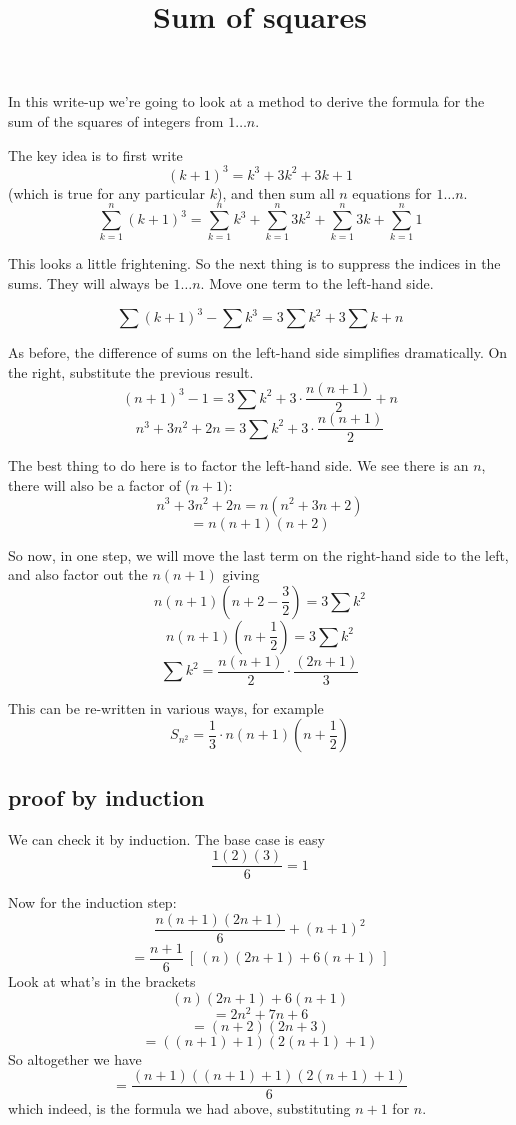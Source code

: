 \documentclass[11pt, oneside]{article}
\title{Sum of squares}
\date{}
\begin{document}
\maketitle
\Large


In this write-up we're going to look at a method to derive the formula for the sum of the squares of integers from $1 \dots n$.

The key idea is to first write
\[ (k + 1)^3 = k^3 + 3k^2 + 3k + 1 \]
(which is true for any particular $k$), and then sum all $n$ equations for $1 \dots n$.
\[ \sum_{k=1}^n (k+1)^3 = \sum_{k=1}^n k^3 + \sum_{k=1}^n 3k^2 + \sum_{k=1}^n 3k + \sum_{k=1}^n 1 \]

This looks a little frightening.  So the next thing is to suppress the indices in the sums.  They will always be $1 \dots n$.  Move one term to the left-hand side.

\[ \sum (k+1)^3 - \sum k^3 = 3 \sum k^2 + 3 \sum k + n \]

As before, the difference of sums on the left-hand side simplifies dramatically.  On the right, substitute the previous result.
\[ (n+1)^3 - 1 = 3 \sum k^2 + 3 \cdot \frac{n(n+1)}{2} + n \]
\[ n^3 + 3n^2 + 2n = 3 \sum k^2 + 3 \cdot \frac{n(n+1)}{2}  \]

The best thing to do here is to factor the left-hand side.  We see there is an $n$, there will also be a factor of ($n + 1)$:
\[ n^3 + 3n^2 + 2n = n(n^2 + 3n + 2) \]
\[ = n (n + 1)(n + 2) \]

So now, in one step, we will move the last term on the right-hand side to the left, and also factor out the $n(n+1)$ giving
\[ n(n+1)(n + 2 - \frac{3}{2}) = 3 \sum k^2 \]
\[ n (n+1)(n + \frac{1}{2}) = 3 \sum k^2 \]
\[ \sum k^2 = \frac{n (n+1)}{2} \cdot \frac{(2n + 1)}{3} \]

This can be re-written in various ways, for example
\[ S_{n^2} = \frac{1}{3} \cdot n (n+1)(n + \frac{1}{2}) \]

\subsection*{proof by induction}

We can check it by induction.  The base case is easy
\[ \frac{1(2)(3)}{6} = 1 \]  

Now for the induction step:
\[ \frac{n(n+1)(2n+1)}{6} + (n+1)^2 \]
\[ = \frac{n+1}{6}  \ [ \ (n)(2n+1) + 6(n+1) \ ] \]
Look at what's in the brackets
\[ (n)(2n+1) + 6(n+1) \]
\[ = 2n^2 + 7n + 6 \]
\[ = (n + 2)(2n + 3) \]
\[ = ((n + 1) + 1)(2(n + 1) + 1) \]
So altogether we have
\[ = \frac{(n+1)((n + 1) + 1)(2(n + 1) + 1)}{6} \]
which indeed, is the formula we had above, substituting $n+1$ for $n$.
\end{document}
